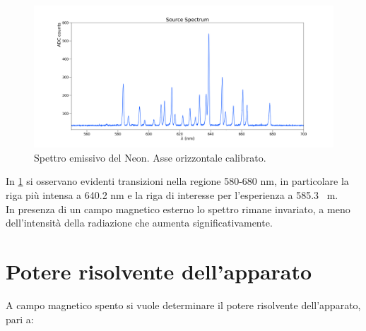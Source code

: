 \documentclass[twocolumn,10pt]{asme2ej}
\begin{document}
\begin{figure}
    \centering
    \includegraphics[width=\textwidth]{../Spectrum/SpectrumPlots/spettro1d_Boff.png}
    \caption{Spettro emissivo del Neon. Asse orizzontale calibrato.}
    \label{i:spettro1d}
\end{figure}

In \figurename\ref{i:spettro1d} si osservano evidenti transizioni nella regione 580-680 \si{\nano \metre}, in
particolare la riga più intensa a 640.2 \si{\nano \metre} e la riga di interesse per l'esperienza a 585.3 \si{\nano
\metre}.\\
In presenza di un campo magnetico esterno lo spettro rimane invariato, a meno dell'intensità della radiazione che
aumenta significativamente. 




\section{Potere risolvente dell'apparato}


A campo magnetico spento si vuole determinare il potere risolvente dell'apparato, pari a:
\end{document}
